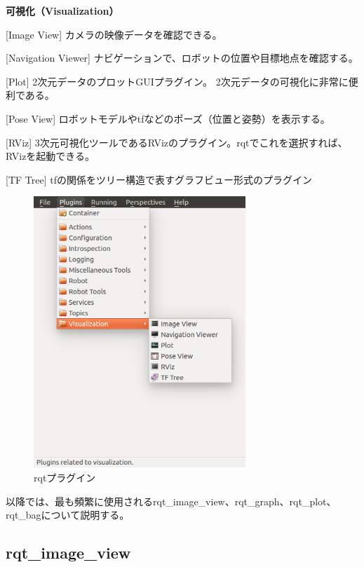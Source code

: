 \textbf{可視化（Visualization）}
\begin{description}
\item  {[Image View]} カメラの映像データを確認できる。
\item  {[Navigation Viewer]} ナビゲーションで、ロボットの位置や目標地点を確認する。
\item  {[Plot]} 2次元データのプロットGUIプラグイン。 2次元データの可視化に非常に便利である。
\item  {[Pose View]} ロボットモデルやtfなどのポーズ（位置と姿勢）を表示する。
\item  {[RViz]} 3次元可視化ツールであるRVizのプラグイン。rqtでこれを選択すれば、RVizを起動できる。
\item  {[TF Tree]} tfの関係をツリー構造で表すグラフビュー形式のプラグイン\\
\end{description}

\begin{figure}[h]
  \centering
  \includegraphics[width=8cm]{pictures/chapter5/pic_05_09.png}
  \caption{rqtプラグイン}
\end{figure}

以降では、最も頻繁に使用されるrqt\_image\_view、rqt\_graph、rqt\_plot、rqt\_bagについて説明する。

\subsection{rqt\_image\_view}

